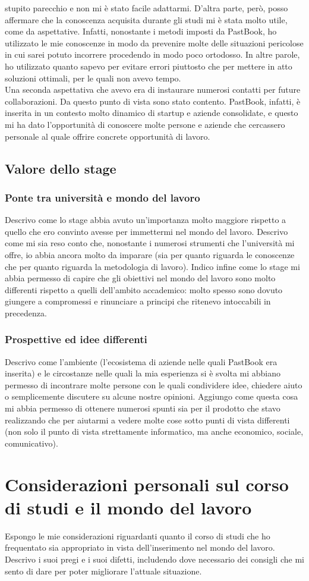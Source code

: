			stupito parecchio e non mi è stato facile adattarmi. D'altra parte, però, posso affermare che la conoscenza acquisita
			durante gli studi mi è stata molto utile, come da aspettative. Infatti, nonostante i metodi imposti da PastBook, ho
			utilizzato le mie conoscenze in modo da prevenire molte delle situazioni pericolose in cui sarei potuto incorrere
			procedendo in modo poco ortodosso. In altre parole, ho utilizzato quanto sapevo per evitare errori piuttosto che per mettere
			in atto soluzioni ottimali, per le quali non avevo tempo.\\
			Una seconda aspettativa che avevo era di instaurare numerosi contatti per future collaborazioni. Da questo punto di vista
			sono stato contento. PastBook, infatti, è inserita in un contesto molto dinamico di startup e aziende consolidate, e questo
			mi ha dato l'opportunità di conoscere molte persone e aziende che cercassero personale al quale offrire concrete opportunità
			di lavoro.
		\subsection{Valore dello stage}
			\subsubsection{Ponte tra università e mondo del lavoro}
				Descrivo come lo stage abbia avuto un'importanza molto maggiore rispetto a quello che ero convinto avesse per
				immettermi nel mondo del lavoro. Descrivo come mi sia reso conto che, nonostante i numerosi strumenti che
				l'università mi offre, io abbia ancora molto da imparare (sia per quanto riguarda le conoscenze che per quanto
				riguarda la metodologia di lavoro). Indico infine come lo stage mi abbia permesso di capire che gli obiettivi nel
				mondo del lavoro sono molto differenti rispetto a quelli dell'ambito accademico: molto spesso sono dovuto giungere
				a compromessi e rinunciare a principi che ritenevo intoccabili in precedenza.
			\subsubsection{Prospettive ed idee differenti}
				Descrivo come l'ambiente (l'ecosistema di aziende nelle quali PastBook era inserita) e le circostanze nelle quali la
				mia esperienza si è svolta mi abbiano permesso di incontrare molte persone con le quali condividere idee, chiedere
				aiuto o semplicemente discutere su alcune nostre opinioni. Aggiungo come questa cosa mi abbia permesso di ottenere
				numerosi spunti sia per il prodotto che stavo realizzando che per aiutarmi a vedere molte cose sotto punti di vista
				differenti (non solo il punto di vista strettamente informatico, ma anche economico, sociale, comunicativo).
	\section{Considerazioni personali sul corso di studi e il mondo del lavoro}
		Espongo le mie considerazioni riguardanti quanto il corso di studi che ho frequentato sia appropriato in vista dell'inserimento
		nel mondo del lavoro. Descrivo i suoi pregi e i suoi difetti, includendo dove necessario dei consigli che mi sento di dare per
		poter migliorare l'attuale situazione.
